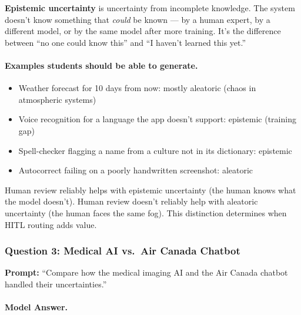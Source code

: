 \textbf{Epistemic uncertainty} is uncertainty from incomplete knowledge. The system doesn't know something that \emph{could} be known --- by a human expert, by a different model, or by the same model after more training. It's the difference between ``no one could know this'' and ``I haven't learned this yet.''

\paragraph{Examples students should be able to generate.}
\begin{itemize}
    \item Weather forecast for 10 days from now: mostly aleatoric (chaos in atmospheric systems)
    \item Voice recognition for a language the app doesn't support: epistemic (training gap)
    \item Spell-checker flagging a name from a culture not in its dictionary: epistemic
    \item Autocorrect failing on a poorly handwritten screenshot: aleatoric
\end{itemize}

\begin{keyconcept}
Human review reliably helps with epistemic uncertainty (the human knows what the model doesn't). Human review doesn't reliably help with aleatoric uncertainty (the human faces the same fog). This distinction determines when HITL routing adds value.
\end{keyconcept}

\subsubsection{Question 3: Medical AI vs.\ Air Canada Chatbot}

\textbf{Prompt:} ``Compare how the medical imaging AI and the Air Canada chatbot handled their uncertainties.''

\paragraph{Model Answer.}

